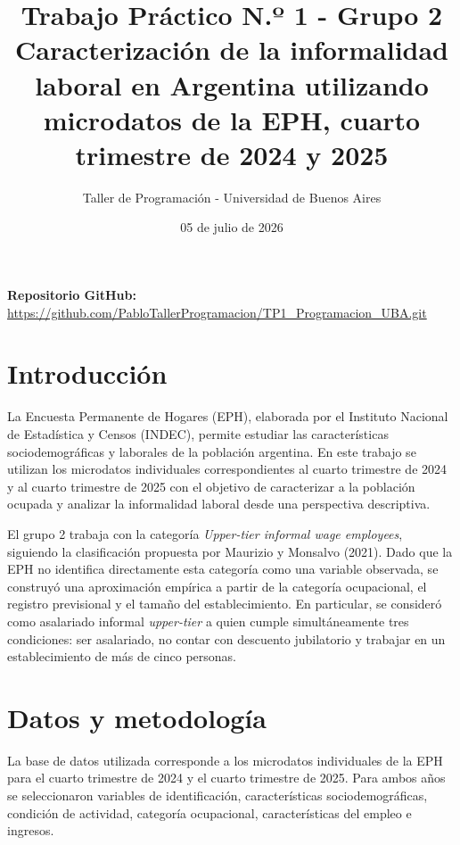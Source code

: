 \documentclass[11pt,a4paper]{article}
\title{\textbf{Trabajo Práctico N.º 1 - Grupo 2}\\
\large Caracterización de la informalidad laboral en Argentina utilizando microdatos de la EPH, cuarto trimestre de 2024 y 2025}
\author{Taller de Programación - Universidad de Buenos Aires}
\date{ 05 de julio de 2026}
\begin{document}
\maketitle

\begin{center}
\textbf{Repositorio GitHub:} \url{https://github.com/PabloTallerProgramacion/TP1_Programacion_UBA.git}
\end{center}

\section{Introducción}

La Encuesta Permanente de Hogares (EPH), elaborada por el Instituto Nacional de Estadística y Censos (INDEC), permite estudiar las características sociodemográficas y laborales de la población argentina. En este trabajo se utilizan los microdatos individuales correspondientes al cuarto trimestre de 2024 y al cuarto trimestre de 2025 con el objetivo de caracterizar a la población ocupada y analizar la informalidad laboral desde una perspectiva descriptiva.

El grupo 2 trabaja con la categoría \textit{Upper-tier informal wage employees}, siguiendo la clasificación propuesta por Maurizio y Monsalvo (2021). Dado que la EPH no identifica directamente esta categoría como una variable observada, se construyó una aproximación empírica a partir de la categoría ocupacional, el registro previsional y el tamaño del establecimiento. En particular, se consideró como asalariado informal \textit{upper-tier} a quien cumple simultáneamente tres condiciones: ser asalariado, no contar con descuento jubilatorio y trabajar en un establecimiento de más de cinco personas.


\section{Datos y metodología}

La base de datos utilizada corresponde a los microdatos individuales de la EPH para el cuarto trimestre de 2024 y el cuarto trimestre de 2025. Para ambos años se seleccionaron variables de identificación, características sociodemográficas, condición de actividad, categoría ocupacional, características del empleo e ingresos.
\end{document}
